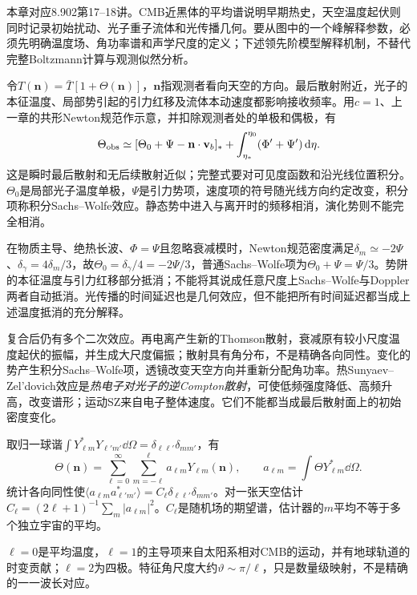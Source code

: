 本章对应8.902第17--18讲。CMB近黑体的平均谱说明早期热史，天空温度起伏则同时记录初始扰动、光子重子流体和光传播几何。要从图中的一个峰解释参数，必须先明确温度场、角功率谱和声学尺度的定义；下述领先阶模型解释机制，不替代完整Boltzmann计算与观测似然分析。

令$T(\mathbf n)=\bar T[1+\Theta(\mathbf n)]$，$\mathbf n$指观测者看向天空的方向。最后散射附近，光子的本征温度、局部势引起的引力红移及流体本动速度都影响接收频率。用$c=1$、上一章的共形Newton规范作示意，并扣除观测者处的单极和偶极，有
\[
 \Theta_{\rm obs}\simeq[\Theta_0+\Psi-\mathbf n\cdot\mathbf v_b]_* 
 +\int_{\eta_*}^{\eta_0}(\Phi'+\Psi')\,\mathrm d\eta.
\]
这是瞬时最后散射和无后续散射近似；完整式要对可见度函数和沿光线位置积分。$\Theta_0$是局部光子温度单极，$\Psi$是引力势项，速度项的符号随光线方向约定改变，积分项称积分Sachs--Wolfe效应。静态势中进入与离开时的频移相消，演化势则不能完全相消。

在物质主导、绝热长波、$\Phi=\Psi$且忽略衰减模时，Newton规范密度满足$\delta_m\simeq-2\Psi$、$\delta_\gamma=4\delta_m/3$，故$\Theta_0=\delta_\gamma/4=-2\Psi/3$，普通Sachs--Wolfe项为$\Theta_0+\Psi=\Psi/3$。势阱的本征温度与引力红移部分抵消；不能将其说成任意尺度上Sachs--Wolfe与Doppler两者自动抵消。光传播的时间延迟也是几何效应，但不能把所有时间延迟都当成上述温度抵消的充分解释。

复合后仍有多个二次效应。再电离产生新的Thomson散射，衰减原有较小尺度温度起伏的振幅，并生成大尺度偏振；散射具有角分布，不是精确各向同性。变化的势产生积分Sachs--Wolfe项，透镜改变天空方向并重新分配角功率。热Sunyaev--Zel'dovich效应是\emph{热电子对光子的逆Compton散射}，可使低频强度降低、高频升高，改变谱形；运动SZ来自电子整体速度。它们不能都当成最后散射面上的初始密度变化。

取归一球谐$\int Y_{\ell m}^*Y_{\ell'm'}\dd\Omega=\delta_{\ell\ell'}\delta_{mm'}$，有
\[
 \Theta(\mathbf n)=\sum_{\ell=0}^{\infty}\sum_{m=-\ell}^{\ell}a_{\ell m}Y_{\ell m}(\mathbf n),
 \qquad a_{\ell m}=\int\Theta Y_{\ell m}^*\dd\Omega.
\]
统计各向同性使$\langle a_{\ell m}a_{\ell'm'}^*\rangle=C_\ell\delta_{\ell\ell'}\delta_{mm'}$。对一张天空估计$\widehat C_\ell=(2\ell+1)^{-1}\sum_m|a_{\ell m}|^2$。$C_\ell$是随机场的期望谱，估计器的$m$平均不等于多个独立宇宙的平均。

$\ell=0$是平均温度，$\ell=1$的主导项来自太阳系相对CMB的运动，并有地球轨道的时变贡献；$\ell=2$为四极。特征角尺度大约$\vartheta\sim\pi/\ell$，只是数量级映射，不是精确的一一波长对应。

